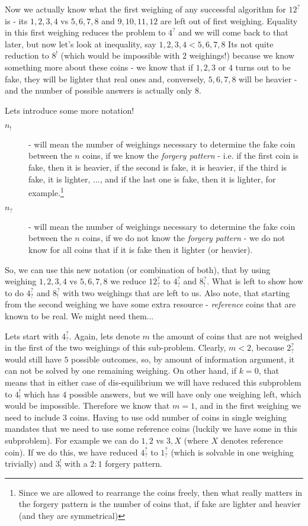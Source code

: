 \begin{problem}
Now we actually know what the first weighing of any successful algorithm for $12^?$ is - its $1,2,3,4$ vs $5,6,7,8$ and $9,10,11,12$ are left out of first weighing. Equality in this first weighing reduces the problem to $4^?$ and we will come back to that later, but now let's look at inequality, say $1,2,3,4<5,6,7,8$ Its not quite reduction to $8^!$ (which would be impossible with $2$ weighings!) because we know something more about these coins - we know that if $1,2,3$ or $4$ turns out to be fake, they will be lighter that real ones and, conversely, $5,6,7,8$ will be heavier - and the number of possible answers is actually only $8$.

Lets introduce some more notation!
\begin{description}
\item[$n_!$] - will mean the number of weighings necessary to determine the fake coin between the $n$ coins, if we know the \textit{forgery pattern} - i.e. if the first coin is fake, then it is heavier, if the second is fake, it is heavier, if the third is fake, it is lighter, $\dots$,  and if the last one is fake, then it is lighter, for example.\footnote{Since we are allowed to rearrange the coins freely, then what really matters in the forgery pattern is the number of coins that, if fake are lighter and heavier (and they are symmetrical)} 
\item[$n_?$] - will mean the number of weighings necessary to determine the fake coin between the $n$ coins, if we do not know the \textit{forgery pattern} - we do not know for all coins that if it is fake then it lighter (or heavier). 
\end{description}

So, we can use this new notation (or combination of both), that by using weighing $1,2,3,4$ vs $5,6,7,8$ we reduce $12^?_?$ to $4^?_?$ and $8^?_!$. What is left to show how to do $4^?_?$ and $8^?_!$ with two weighings that are left to us. Also note, that starting from the second weighing we have some extra resource - \textit{reference} coins that are known to be real. We might need them...

Lets start with $4^?_?$. Again, lets denote $m$ the amount of coins that are not weighed in the first of the two weighings of this sub-problem. Clearly, $m<2$, because $2^?_?$ would still have $5$ possible outcomes, so, by amount of information argument, it can not be solved by one remaining weighing.  On other hand, if $k=0$, that means that in either case of dis-equilibrium we will have reduced this subproblem to $4^!_!$ which has $4$ possible answers, but we will have only one weighing left, which would be impossible. Therefore we know that $m=1$, and in the first weighing we need to include $3$ coins.  Having to use odd number of coins in single weighing mandates that we need to use some reference coins (luckily we have some in this subproblem). For example we can do $1,2$ vs $3,X$ (where $X$ denotes reference coin). If we do this, we have reduced $4^?_?$ to $1^?_?$ (which is solvable in one weighing trivially) and $3^!_!$ with a $2:1$ forgery pattern.


\end{problem}
